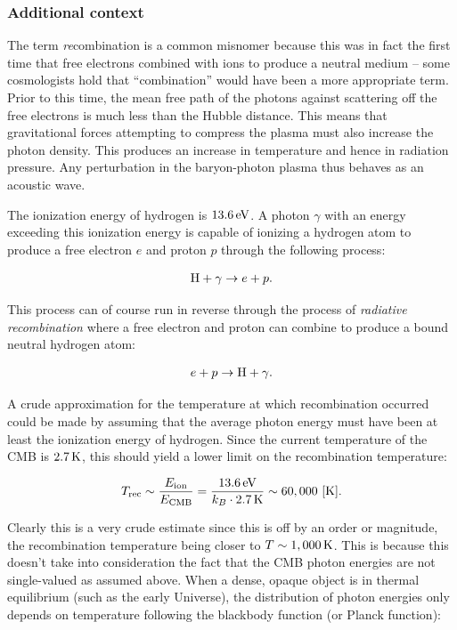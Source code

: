 \documentclass[a4paper,11pt]{article}
\begin{document}
\subsubsection{Additional context}

The term \textit{re}combination is a common misnomer because this was in fact the first time that free electrons combined with ions to produce a neutral medium -- some cosmologists hold that ``combination'' would have been a more appropriate term. Prior to this time, the mean free path of the photons against scattering
off the free electrons is much less than the Hubble distance.
This means that gravitational forces attempting to compress the
plasma must also increase the photon density. This produces an
increase in temperature and hence in radiation pressure. Any perturbation in the baryon-photon plasma thus behaves as an acoustic
wave.

{\noindent}The ionization energy of hydrogen is $13.6\,{\rm eV}$. A photon $\gamma$ with an energy exceeding this ionization energy is capable of ionizing a hydrogen atom to produce a free electron $e$ and proton $p$ through the following process:

\begin{align*}
    {\rm H} + \gamma \rightarrow e + p.
\end{align*}

{\noindent}This process can of course run in reverse through the process of \textit{radiative recombination} where a free electron and proton can combine to produce a bound neutral hydrogen atom:

\begin{align*}
    e + p \rightarrow {\rm H} + \gamma.
\end{align*}

{\noindent}A crude approximation for the temperature at which recombination occurred could be made by assuming that the average photon energy must have been at least the ionization energy of hydrogen. Since the current temperature of the CMB is $2.7\,{\rm K}$, this should yield a lower limit on the recombination temperature:

\begin{align*}
    T_\mathrm{rec} \sim \frac{E_\mathrm{ion}}{E_\mathrm{CMB}} = \frac{13.6\,{\rm eV}}{k_B \cdot 2.7\,{\rm K}} \sim 60,000 ~ [{\rm K}].
\end{align*}

{\noindent}Clearly this is a very crude estimate since this is off by an order or magnitude, the recombination temperature being closer to $T \sim 1,000\,{\rm K}$. This is because this doesn't take into consideration the fact that the CMB photon energies are not single-valued as assumed above. When a dense, opaque object is in thermal equilibrium (such as the early Universe), the distribution of photon energies only depends on temperature following the blackbody function (or Planck function):
\end{document}
